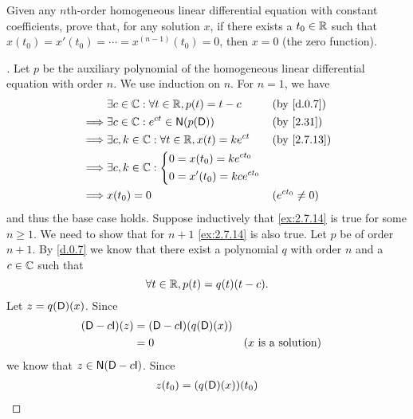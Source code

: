 \begin{ex}\label{ex:2.7.14}
  Given any \(n\)th-order homogeneous linear differential equation with constant coefficients, prove that, for any solution \(x\), if there exists a \(t_0 \in \mathbb{R}\) such that \(x(t_0) = x'(t_0) = \cdots = x^{(n - 1)}(t_0) = 0\), then \(x = 0\) (the zero function).
\end{ex}

\begin{proof}[]
  Let \(p\) be the auxiliary polynomial of the homogeneous linear differential equation with order \(n\).
  We use induction on \(n\).
  For \(n = 1\), we have
  \begin{align*}
             & \exists c \in \C : \forall t \in \R, p(t) = t - c       &  & \by{d.0.7}         \\
    \implies & \exists c \in \C : e^{ct} \in \ns{p(\Dop)}              &  & \by{2.31}          \\
    \implies & \exists c, k \in \C : \forall t \in \R, x(t) = k e^{ct} &  & \by{2.7.13}        \\
    \implies & \exists c, k \in \C : \begin{dcases}
                                       0 = x(t_0) = k e^{c t_0} \\
                                       0 = x'(t_0) = k c e^{c t_0}
                                     \end{dcases}                                \\
    \implies & x(t_0) = 0                                              &  & (e^{c t_0} \neq 0)
  \end{align*}
  and thus the base case holds.
  Suppose inductively that \cref{ex:2.7.14} is true for some \(n \geq 1\).
  We need to show that for \(n + 1\) \cref{ex:2.7.14} is also true.
  Let \(p\) be of order \(n + 1\).
  By \cref{d.0.7} we know that there exist a polynomial \(q\) with order \(n\) and a \(c \in \mathbb{C}\) such that
  \[
    \forall t \in \mathbb{R}, p(t) = q(t) (t - c).
  \]
  Let \(z = q(\mathsf{D})(x)\).
  Since
  \begin{align*}
    (\Dop - c \IT)(z) & = (\Dop - c \IT)(q(\Dop)(x))                                   \\
                      & = 0                          &  & \text{(\(x\) is a solution)}
  \end{align*}
  we know that \(z \in \ns{\Dop - c \IT}\).
  Since
  \begin{align*}
    z(t_0) & = (q(\Dop)(x))(t_0)                                                  \\

\end{align*}
\end{proof}
